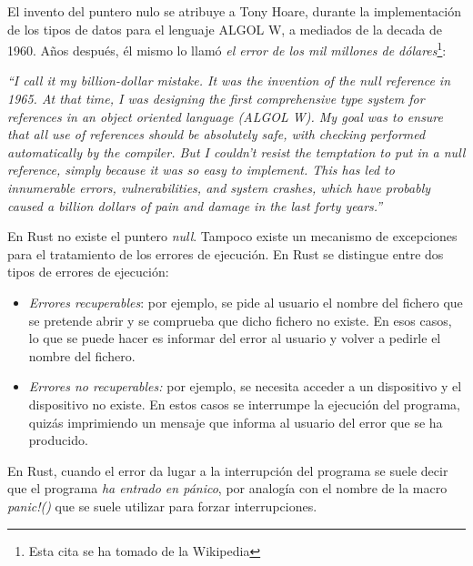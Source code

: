 El invento del puntero nulo se atribuye a Tony Hoare, durante la implementación de los tipos de datos para el lenguaje ALGOL W, a mediados de la decada de 1960. Años después, él mismo lo llamó \textit{el error de los mil millones de dólares}\footnote{Esta cita se ha tomado de la Wikipedia}:
\begin{center}
   \begin{minipage}{0.8\textwidth}
      \itshape\small
      \hspace{1em}``I call it my billion-dollar mistake. It was the invention of the null reference in 1965. At that time, I was designing the first comprehensive type system for references in an object oriented language (ALGOL W). My goal was to ensure that all use of references should be absolutely safe, with checking performed automatically by the compiler. But I couldn't resist the temptation to put in a null reference, simply because it was so easy to implement. This has led to innumerable errors, vulnerabilities, and system crashes, which have probably caused a billion dollars of pain and damage in the last forty years.''
   \end{minipage}
\end{center}

\vspace{1em}
En Rust no existe el puntero \textit{null}. Tampoco existe un mecanismo de excepciones para el tratamiento de los errores de ejecución. En Rust se distingue entre dos tipos de errores de ejecución:

\begin{itemize}
   \item \textit{Errores recuperables}: por ejemplo, se pide al usuario el nombre del fichero que se pretende abrir y se comprueba que dicho fichero no existe. En esos casos, lo que se puede hacer es informar del error al usuario y volver a pedirle el nombre del fichero.
   \item \textit{Errores no recuperables:} por ejemplo, se necesita acceder a un dispositivo y el dispositivo no existe. En estos casos se interrumpe la ejecución del programa, quizás imprimiendo un mensaje que informa al usuario del error que se ha producido.
\end{itemize}

En Rust, cuando el error da lugar a la interrupción del programa se suele decir que el programa \textit{ha entrado en pánico}, por analogía con el nombre de la macro \textit{panic!()} que se suele utilizar para forzar  interrupciones. 

